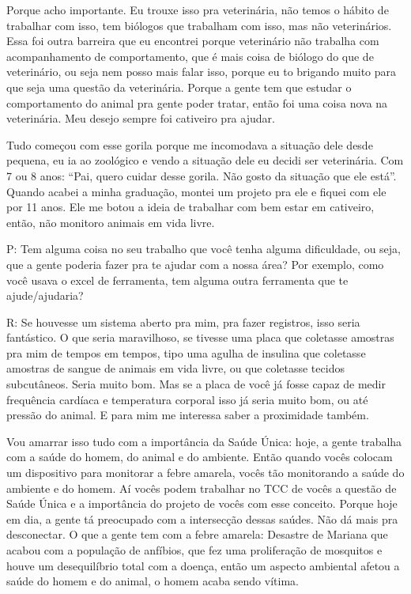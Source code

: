 Porque acho importante. Eu trouxe isso pra veterinária, não temos o hábito de trabalhar com isso, tem biólogos que trabalham com isso, mas não veterinários. Essa foi outra barreira que eu encontrei porque veterinário não trabalha com acompanhamento de comportamento, que é mais coisa de biólogo do que de veterinário, ou seja nem posso mais falar isso, porque eu to brigando muito para que seja uma questão da veterinária. Porque a gente tem que estudar o comportamento do animal pra gente poder tratar, então foi uma coisa nova na veterinária. Meu desejo sempre foi cativeiro pra ajudar. 

Tudo começou com esse gorila porque me incomodava a situação dele desde pequena, eu ia ao zoológico e vendo a situação dele eu decidi ser veterinária. Com 7 ou 8 anos: “Pai, quero cuidar desse gorila. Não gosto da situação que ele está”. Quando acabei a minha graduação, montei um projeto pra ele e fiquei com ele por 11 anos. Ele me botou a ideia de trabalhar com bem estar em cativeiro, então, não monitoro animais em vida livre.


P: Tem alguma coisa no seu trabalho que você tenha alguma dificuldade, ou seja, que a gente poderia fazer pra te ajudar com a nossa área? Por exemplo, como você usava o excel de ferramenta, tem alguma outra ferramenta que te ajude/ajudaria?

R: Se houvesse um sistema aberto pra mim, pra fazer registros, isso seria fantástico. O que seria maravilhoso, se tivesse uma placa que coletasse amostras pra mim de tempos em tempos, tipo uma agulha de insulina que coletasse amostras de sangue de animais em vida livre, ou que coletasse tecidos subcutâneos. Seria muito bom. Mas se a placa de você já fosse capaz de medir frequência cardíaca e temperatura corporal isso já seria muito bom, ou até pressão do animal. E para mim me interessa saber a proximidade também.

Vou amarrar isso tudo com a importância da Saúde Única: hoje, a gente trabalha com a saúde do homem, do animal e do ambiente. Então quando vocês colocam um dispositivo para monitorar a febre amarela, vocês tão monitorando a saúde do ambiente e do homem. Aí vocês podem trabalhar no TCC de vocês a questão de Saúde Única e a importância do projeto de vocês com esse conceito. Porque hoje em dia, a gente tá preocupado com a intersecção dessas saúdes. Não dá mais pra desconectar. O que a gente tem com a febre amarela: Desastre de Mariana que acabou com a população de anfíbios, que fez uma proliferação de mosquitos e houve um desequilíbrio total com a doença, então um aspecto ambiental afetou a saúde do homem e do animal, o homem acaba sendo vítima.

